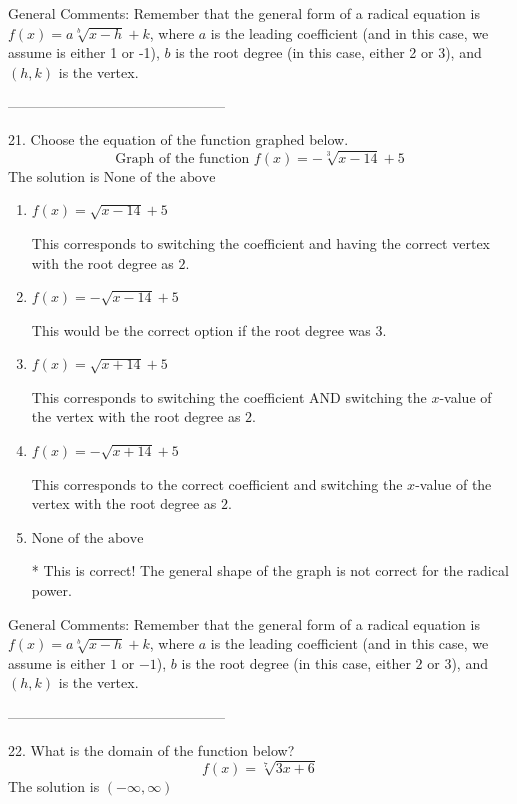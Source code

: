 \documentclass{article}[14pt]
\begin{document}
General Comments: Remember that the general form of a radical equation is $ f(x) = a \sqrt[b]{x - h} + k $, where $a$ is the leading coefficient (and in this case, we assume is either 1 or -1), $b$ is the root degree (in this case, either 2 or 3), and $(h, k)$ is the vertex.

-----------------------------------------------

21. Choose the equation of the function graphed below.
$$ \text{Graph of the function } f(x) = - \sqrt[3]{x - 14} + 5 $$ 
The solution is $ \text{None of the above} $ 

\begin{enumerate}[label=\Alph*.] 
\item $ f(x) = \sqrt{x - 14} + 5 $ 

 This corresponds to switching the coefficient and having the correct vertex with the root degree as $2$. 
\item $ f(x) = - \sqrt{x - 14} + 5 $ 

 This would be the correct option if the root degree was $3$. 
\item $ f(x) = \sqrt{x + 14} + 5 $ 

 This corresponds to switching the coefficient AND switching the $x$-value of the vertex with the root degree as $2$. 
\item $ f(x) = - \sqrt{x + 14} + 5 $ 

 This corresponds to the correct coefficient and switching the $x$-value of the vertex with the root degree as $2$. 
\item $ \text{None of the above} $ 

 * This is correct! The general shape of the graph is not correct for the radical power. 
\end{enumerate} 
 
General Comments: Remember that the general form of a radical equation is $ f(x) = a \sqrt[b]{x - h} + k$, where $a$ is the leading coefficient (and in this case, we assume is either $1$ or $-1$), $b$ is the root degree (in this case, either $2$ or $3$), and $(h, k)$ is the vertex.

-----------------------------------------------

22. What is the domain of the function below?
$$ f(x) = \sqrt[7]{3 x + 6} $$ 
The solution is $ (-\infty, \infty) $ 
\end{document}
